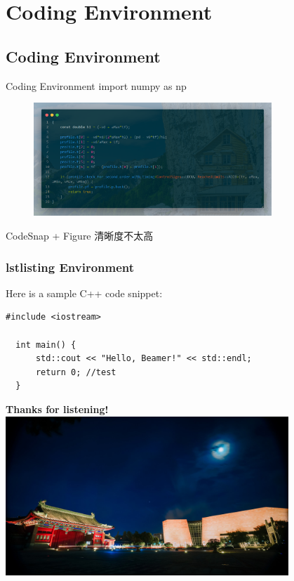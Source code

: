 \documentclass[xcolor=x11names,compress]{ctexbeamer}
\begin{document}
\section{Coding Environment}
\subsection{Coding Environment}
\begin{frame}{Coding Environment}
import numpy as np

\begin{figure}
\includegraphics[width=0.8\textwidth]{Figure/code.png}
\end{figure}

CodeSnap + Figure 清晰度不太高


\end{frame}


\begin{frame}[fragile] %
  \frametitle{lstlisting Environment}
  
  Here is a sample C++ code snippet:\\
  
  \begin{lstlisting}[caption={Sample C++ Code}]
  #include <iostream>
  
  int main() {
      std::cout << "Hello, Beamer!" << std::endl;
      return 0; //test
  }
  \end{lstlisting}
  
  \end{frame}

  
  \begin{frame}
    \begin{center}
      \vspace{1cm}
      \Huge \textbf{Thanks for listening!}
      \vspace{2cm}
      \includegraphics[width=0.8\textwidth]{Figure/siyuan.jpg} %
    \end{center}
  \end{frame}
\end{document}
